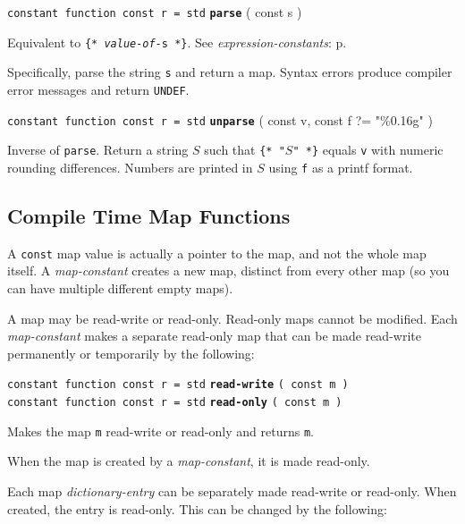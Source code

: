 \documentclass[12pt]{article}
\newcommand{\ttkey}[1]{{\tt \bfseries #1}}
\newcommand{\pagref}[1]{p\pageref{#1}}
\newenvironment{indpar}[1][0.3in]%
	{\begin{list}{}%
		     {\setlength{\itemsep}{0in}%
		      \setlength{\topsep}{0in}%
		      \setlength{\parsep}{1ex}%
		      \setlength{\labelwidth}{#1}%
		      \setlength{\leftmargin}{#1}%
		      \addtolength{\leftmargin}{\labelsep}}%
	 \item}%
	{\end{list}}
\begin{document}
{\tt constant function const r = std} \ttkey{parse} ( const s  )
\begin{indpar}
Equivalent to {\tt \{* {\rm \em value-of-}s *\}}.
See {\em expression-constants}: \pagref{EXPRESSION-CONSTANT}.

Specifically, parse the string {\tt s} and return a map.
Syntax errors produce compiler error messages and
return {\tt UNDEF}.
\end{indpar}

{\tt constant function const r = std} \ttkey{unparse}
	( const v, const f ?= "\%0.16g"  )
\begin{indpar}
Inverse of {\tt parse}.  Return a string $S$ such
that {\tt \{* "$S$" *\}} equals {\tt v} with numeric rounding differences.
Numbers are printed in $S$ using {\tt f} as a printf format.
\end{indpar}

\subsection{Compile Time Map Functions}

A {\tt const} map value is actually a pointer to the map,
and not the whole map itself.
A {\em map-constant} creates a new map, distinct from every
other map (so you can have multiple different empty maps).

A map may be read-write or read-only.\label{READ-ONLY-MAP}
Read-only maps cannot
be modified.  Each {\em map-constant} makes a separate read-only
map that can be made read-write permanently or temporarily by
the following:

{\tt constant function const r = std} \ttkey{read-write} {\tt ( const m )} \\
{\tt constant function const r = std} \ttkey{read-only} {\tt ( const m )}
\begin{indpar}
Makes the map {\tt m} read-write or read-only and returns {\tt m}.

When the map is created by a {\em map-constant}, it is made read-only.
\end{indpar}

Each map {\em dictionary-entry} can be separately made read-write or
read-only.  When created, the entry is read-only.  This can be
changed by the following:
\end{document}
